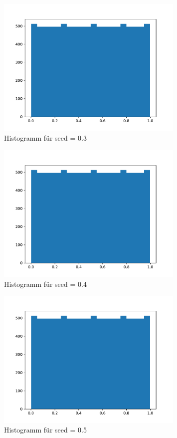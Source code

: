 \begin{figure}[H]
  \centering
  \includegraphics[width=0.8\textwidth]{nr8_c_seed=0.3.pdf}
  \caption{Histogramm für seed = 0.3}
\end{figure}

\begin{figure}[H]
  \centering
  \includegraphics[width=0.8\textwidth]{nr8_c_seed=0.4.pdf}
  \caption{Histogramm für seed = 0.4}
\end{figure}

\begin{figure}[H]
  \centering
  \includegraphics[width=0.8\textwidth]{nr8_c_seed=0.5.pdf}
  \caption{Histogramm für seed = 0.5}
\end{figure}

